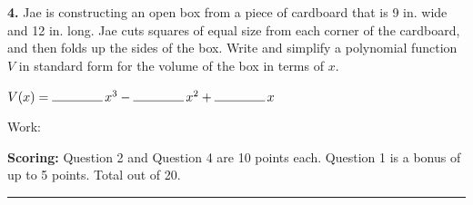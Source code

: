 \documentclass[11pt]{article}
\begin{document}
\vspace{6pt}
\begin{minipage}[t]{0.62\textwidth}
\textbf{4.} Jae is constructing an open box from a piece of cardboard that is 9 in. wide and 12 in. long. Jae cuts squares of equal size from each corner of the cardboard, and then folds up the sides of the box. Write and simplify a polynomial function $V$ in standard form for the volume of the box in terms of $x$.

\vspace{8pt}
$V(x)=\rule{1.4cm}{0.4pt}\,x^3-\rule{1.4cm}{0.4pt}\,x^2+\rule{1.4cm}{0.4pt}\,x$

\vspace{4pt}
Work:
\end{minipage}\hfill
\begin{minipage}[t]{0.34\textwidth}
\vspace{0pt}
\begin{center}
\end{center}
\end{minipage}

\vfill
\noindent\textbf{Scoring:} Question 2 and Question 4 are 10 points each. Question 1 is a bonus of up to 5 points. Total out of 20.

\newpage
{}

\vspace{4pt}\noindent\rule{\textwidth}{0.6pt}
\end{document}
